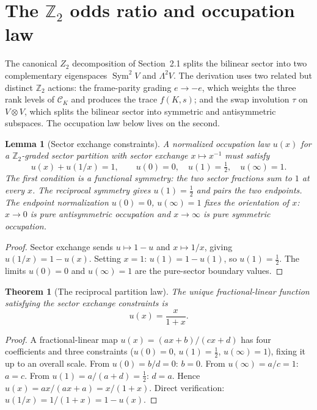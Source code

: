 \documentclass[10pt]{article}
\newtheorem{theorem}{Theorem}
\newtheorem{lemma}{Lemma}
\DeclareMathOperator{\Sym}{Sym}
\begin{document}
\section{\texorpdfstring{The $\mathbb Z_2$ odds ratio and occupation law}{The Z2 odds ratio and occupation law}}
The canonical $Z_2$ decomposition of Section~2.1 splits the bilinear sector
into two complementary eigenspaces $\Sym^2V$ and $\Lambda^2V$.  The
derivation uses two related but distinct $\mathbb Z_2$ actions: the
frame-parity grading $e\to-e$, which weights the three rank levels of
$\mathcal C_K$ and produces the trace $f(K,s)$; and the swap involution
$\tau$ on $V\otimes V$, which splits the bilinear sector into symmetric and
antisymmetric subspaces.  The occupation law below lives on the second.

\begin{lemma}[Sector exchange constraints]
A normalized occupation law $u(x)$ for a $\mathbb Z_2$-graded sector partition with
sector exchange $x\mapsto x^{-1}$ must satisfy
\[
        u(x)+u(1/x)=1,
        \qquad
        u(0)=0,
        \quad
        u(1)=\tfrac12,
        \quad
        u(\infty)=1.
\]
The first condition is a functional symmetry: the two sector fractions
sum to $1$ at every $x$.  The reciprocal symmetry gives $u(1)=\frac12$
and pairs the two endpoints.  The endpoint normalization $u(0)=0$,
$u(\infty)=1$ fixes the orientation of $x$: $x\to0$ is pure antisymmetric
occupation and $x\to\infty$ is pure symmetric occupation.
\end{lemma}

\begin{proof}
Sector exchange sends $u\mapsto 1-u$ and $x\mapsto 1/x$, giving
$u(1/x)=1-u(x)$.  Setting $x=1$: $u(1)=1-u(1)$, so $u(1)=\frac12$.
The limits $u(0)=0$ and $u(\infty)=1$ are the pure-sector boundary values.
\end{proof}

\begin{theorem}[The reciprocal partition law]
The unique fractional-linear function satisfying the sector exchange
constraints is
\[
        \boxed{u(x)=\frac{x}{1+x}}.
\]
\end{theorem}

\begin{proof}
A fractional-linear map $u(x)=(ax+b)/(cx+d)$ has four coefficients
and three constraints ($u(0)=0$, $u(1)=\frac12$, $u(\infty)=1$),
fixing it up to an overall scale.  From $u(0)=b/d=0$: $b=0$.
From $u(\infty)=a/c=1$: $a=c$.  From $u(1)=a/(a+d)=\frac12$: $d=a$.
Hence $u(x)=ax/(ax+a)=x/(1+x)$.  Direct verification:
$u(1/x)=1/(1+x)=1-u(x)$.
\end{proof}
\end{document}
